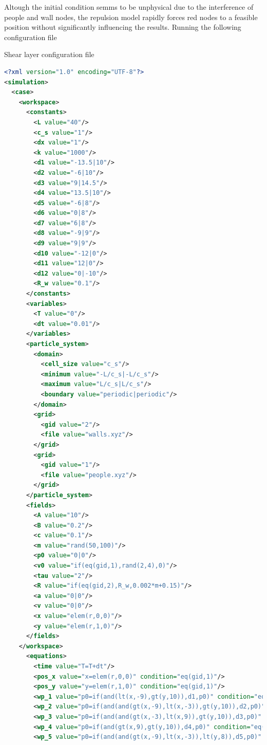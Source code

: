 \documentclass[a4paper,12pt,openany]{book}
\theoremstyle{break}
\begin{document}
Altough the initial condition semms to be unphysical due to the interference of people and wall nodes, the repulsion model rapidly forces red nodes to a feasible position without significantly influencing the results.
Running the following configuration file
\begin{samepage}
\begin{example}{Shear layer configuration file}{}
\lstset{basicstyle=\tiny}
\begin{lstlisting}[language=XML]
<?xml version="1.0" encoding="UTF-8"?>
<simulation>
  <case>
    <workspace>
      <constants>
        <L value="40"/>
        <c_s value="1"/>
        <dx value="1"/>
        <k value="1000"/>
        <d1 value="-13.5|10"/>
        <d2 value="-6|10"/>
        <d3 value="9|14.5"/>
        <d4 value="13.5|10"/>
        <d5 value="-6|8"/>
        <d6 value="0|8"/>
        <d7 value="6|8"/>
        <d8 value="-9|9"/>
        <d9 value="9|9"/>
        <d10 value="-12|0"/>
        <d11 value="12|0"/>
        <d12 value="0|-10"/>
        <R_w value="0.1"/>
      </constants>
      <variables>
        <T value="0"/>
        <dt value="0.01"/>
      </variables>
      <particle_system>
        <domain>
          <cell_size value="c_s"/>
          <minimum value="-L/c_s|-L/c_s"/>
          <maximum value="L/c_s|L/c_s"/>
          <boundary value="periodic|periodic"/>
        </domain>
        <grid>
          <gid value="2"/>
          <file value="walls.xyz"/>
        </grid>
        <grid>
          <gid value="1"/>
          <file value="people.xyz"/>
        </grid>
      </particle_system>
      <fields>
        <A value="10"/>
        <B value="0.2"/>
        <c value="0.1"/>
        <m value="rand(50,100)"/>
        <p0 value="0|0"/>
        <v0 value="if(eq(gid,1),rand(2,4),0)"/>
        <tau value="2"/>
        <R value="if(eq(gid,2),R_w,0.002*m+0.15)"/>
        <a value="0|0"/>
        <v value="0|0"/>
        <x value="elem(r,0,0)"/>
        <y value="elem(r,1,0)"/>
      </fields>
    </workspace>
      <equations>
        <time value="T=T+dt"/>
        <pos_x value="x=elem(r,0,0)" condition="eq(gid,1)"/>
        <pos_y value="y=elem(r,1,0)" condition="eq(gid,1)"/>
        <wp_1 value="p0=if(and(lt(x,-9),gt(y,10)),d1,p0)" condition="eq(gid,1)"/>
        <wp_2 value="p0=if(and(and(gt(x,-9),lt(x,-3)),gt(y,10)),d2,p0)" condition="eq(gid,1)"/>
        <wp_3 value="p0=if(and(and(gt(x,-3),lt(x,9)),gt(y,10)),d3,p0)" condition="eq(gid,1)"/>
        <wp_4 value="p0=if(and(gt(x,9),gt(y,10)),d4,p0)" condition="eq(gid,1)"/>
        <wp_5 value="p0=if(and(and(gt(x,-9),lt(x,-3)),lt(y,8)),d5,p0)" condition="eq(gid,1)"/>

\end{lstlisting}
\end{example}
\end{samepage}
\end{document}
